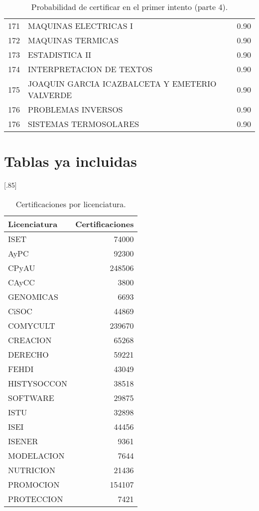 \documentclass[12pt]{article}
\begin{document}
\begin{table}[ht]
{\begin{tabular}{rlr}
  171 & MAQUINAS ELECTRICAS I & 0.90 \\ 
  172 & MAQUINAS TERMICAS & 0.90 \\ 
  173 & ESTADISTICA II & 0.90 \\ 
  174 & INTERPRETACION DE TEXTOS & 0.90 \\ 
  175 & JOAQUIN GARCIA ICAZBALCETA Y EMETERIO VALVERDE & 0.90 \\ 
  176 & PROBLEMAS INVERSOS & 0.90 \\ 
  176 & SISTEMAS TERMOSOLARES & 0.90 \\ 
   \hline
\end{tabular}
}\caption{\label{Prob_Cert_Intento_4}Probabilidad de certificar en el primer intento (parte 4).}

\end{table}


\section{Tablas ya incluidas}

\begin{table}[ht]
\centering
\scalebox{0.75}[.85]{
\begin{tabular}{lr}
  \hline
 Licenciatura& Certificaciones \\ 
  \hline
ISET & 74000 \\ 
  AyPC & 92300 \\ 
  CPyAU & 248506 \\ 
  CAyCC & 3800 \\ 
  GENOMICAS & 6693 \\ 
  CiSOC & 44869 \\ 
  COMYCULT & 239670 \\ 
  CREACION & 65268 \\ 
  DERECHO & 59221 \\ 
  FEHDI & 43049 \\ 
  HISTYSOCCON & 38518 \\ 
  SOFTWARE & 29875 \\ 
  ISTU & 32898 \\ 
  ISEI & 44456 \\ 
  ISENER & 9361 \\ 
  MODELACION & 7644 \\ 
  NUTRICION & 21436 \\ 
  PROMOCION & 154107 \\ 
  PROTECCION & 7421 \\ 
   \hline
\end{tabular}
}
\caption{\label{Cert_Lic} Certificaciones por licenciatura.}
\end{table}
\end{document}
